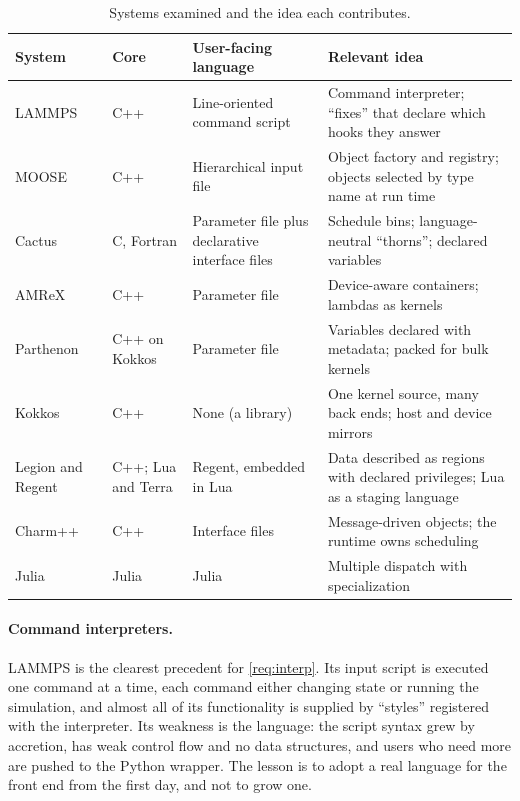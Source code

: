 \documentclass[11pt,a4paper]{article}
\begin{document}
\begin{table}[ht]
\centering
\small
\begin{tabularx}{\textwidth}{@{}l l L L@{}}
\toprule
System & Core & User-facing language & Relevant idea \\
\midrule
LAMMPS~\cite{lammps} & C++ & Line-oriented command script & Command interpreter; \enquote{fixes} that declare which hooks they answer \\
MOOSE~\cite{moose} & C++ & Hierarchical input file & Object factory and registry; objects selected by type name at run time \\
Cactus~\cite{cactus} & C, Fortran & Parameter file plus declarative interface files & Schedule bins; language-neutral \enquote{thorns}; declared variables \\
AMReX~\cite{amrex} & C++ & Parameter file & Device-aware containers; lambdas as kernels \\
Parthenon~\cite{parthenon} & C++ on Kokkos & Parameter file & Variables declared with metadata; packed for bulk kernels \\
Kokkos~\cite{kokkos3} & C++ & None (a library) & One kernel source, many back ends; host and device mirrors \\
Legion and Regent~\cite{legion,regent} & C++; Lua and Terra & Regent, embedded in Lua & Data described as regions with declared privileges; Lua as a staging language \\
Charm++~\cite{charm} & C++ & Interface files & Message-driven objects; the runtime owns scheduling \\
Julia~\cite{julia} & Julia & Julia & Multiple dispatch with specialization \\
\bottomrule
\end{tabularx}
\caption{Systems examined and the idea each contributes.}
\label{tab:prior}
\end{table}

\paragraph{Command interpreters.}  LAMMPS is the clearest precedent for
\ref{req:interp}.  Its input script is executed one command at a time, each
command either changing state or running the simulation, and almost all of its
functionality is supplied by \enquote{styles} registered with the interpreter.
Its weakness is the language: the script syntax grew by accretion, has weak
control flow and no data structures, and users who need more are pushed to the
Python wrapper.  The lesson is to adopt a real language for the front end from
the first day, and not to grow one.
\end{document}
